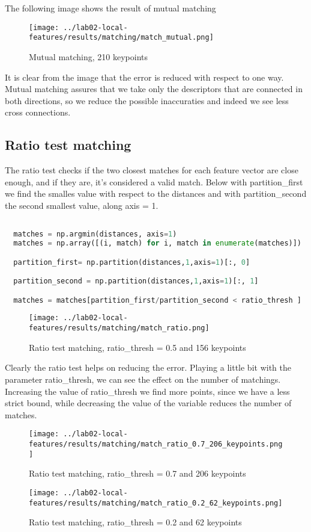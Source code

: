 \documentclass{ETHExercise}
\begin{document}
The following image shows the result of mutual matching

\begin{figure}[!h]
  \centering
  \texttt{[image: ../lab02-local-features/results/matching/match\_mutual.png]}
  \caption{Mutual matching, 210 keypoints}
\end{figure}

It is clear from the image that the error is reduced with respect to one way.
Mutual matching assures that we take only the descriptors that are connected 
in both directions, so we reduce the possible inaccuraties and indeed we see less
cross connections.

\subsection{Ratio test matching}
The ratio test checks if the two closest matches for each feature vector 
are close enough, and if they are, it's considered a valid match.
Below with partition\_first we find the smalles value with respect to the 
distances and with partition\_second the second smallest value, along axis = 1.
\begin{lstlisting}[language=Python, caption=Ratio test matching]

  matches = np.argmin(distances, axis=1)
  matches = np.array([(i, match) for i, match in enumerate(matches)])

  partition_first= np.partition(distances,1,axis=1)[:, 0]

  partition_second = np.partition(distances,1,axis=1)[:, 1]

  matches = matches[partition_first/partition_second < ratio_thresh ]
  \end{lstlisting}
\begin{figure}[!h]
  \centering
  \texttt{[image: ../lab02-local-features/results/matching/match\_ratio.png]}
  \caption{Ratio test matching, ratio\_thresh = 0.5 and 156 keypoints}
\end{figure}

Clearly the ratio test helps on reducing the error. Playing a little bit with the parameter ratio\_thresh,
we can see the effect on the number of matchings. Increasing the value of 
ratio\_thresh we find more points, since we have a less strict bound, while decreasing the value
of the variable reduces the number of matches.
\begin{figure}[!h]
  \centering
  \texttt{[image: ../lab02-local-features/results/matching/match\_ratio\_0.7\_206\_keypoints.png]}
  \caption{Ratio test matching, ratio\_thresh = 0.7 and 206 keypoints}
\end{figure}

\begin{figure}[!t]
  \centering
  \texttt{[image: ../lab02-local-features/results/matching/match\_ratio\_0.2\_62\_keypoints.png]}
  \caption{Ratio test matching, ratio\_thresh = 0.2 and 62 keypoints}
\end{figure}
\end{document}
